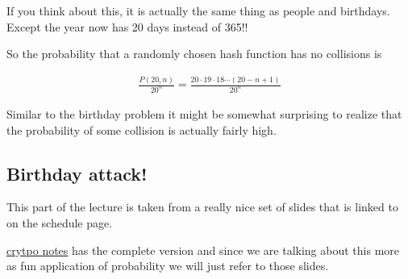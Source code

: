 \documentclass[12pt]{article}
\begin{document}
If you think about this, it is actually the same thing as people and birthdays. Except the year now has 20 days instead of 365!!

So the probability that a randomly chosen hash function has no collisions is

\begin{align*}
\frac{P(20, n)}{20^n} = \frac{20 \cdot 19 \cdot 18 \cdots (20 - n + 1)} {20^n}
\end{align*}

Similar to the birthday problem it might be somewhat surprising to realize that the probability of some collision is actually fairly high.

\subsection*{Birthday attack!}

This part of the lecture is taken from a really nice set of slides that is linked to on the schedule page.

\href{http://www.facweb.iitkgp.ernet.in/~sourav/lecture_note9.pdf}{crytpo notes} has the complete version and since we are talking about this more as fun application of probability we will just refer to those slides.
\end{document}
